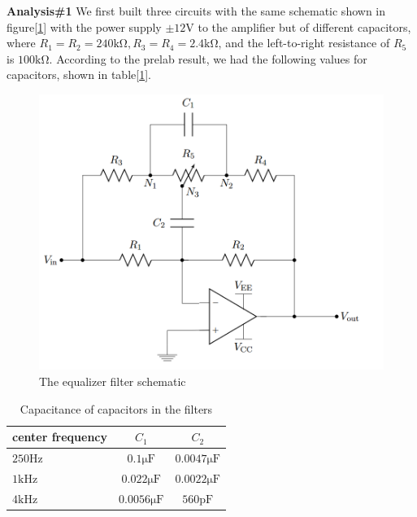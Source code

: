 \hfill \newline
\textbf{Analysis\#1} \newline
\phantom{ } We first built three circuits with the same schematic shown in figure[\ref{fig:circ1}] with the power supply $\pm12\si{\volt}$ to the amplifier but of different capacitors, where $R_1=R_2=240\si{\kilo\ohm},R_3=R_4=2.4\si{\kilo\ohm}$, and the left-to-right resistance of $R_5$ is $100\si{\kilo\ohm}$. According to the prelab result, we had the following values for capacitors, shown in table[\ref{tab:chos}].

\begin{figure}[!htbp]
	\centering
	\begin{framed}
		\includegraphics[width=\linewidth]{images/circ1.png}
		\caption{The equalizer filter schematic}
		\label{fig:circ1}
	\end{framed}
\end{figure}

\begin{table}[!htbp]
	\centering
	\caption{Capacitance of capacitors in the filters}
	\begin{tabular}{lcc}
		\toprule
		center frequency & $C_1$ & $C_2$ \\
		\midrule
		$250\si{\hertz}$ & $0.1\si{\micro\farad}$ & $0.0047\si{\micro\farad}$ \\
		$1\si{\kilo\hertz}$ & $0.022\si{\micro\farad}$ & $0.0022\si{\micro\farad}$ \\
		$4\si{\kilo\hertz}$ & $0.0056\si{\micro\farad}$ & $560\si{\pico\farad}$ \\
		\bottomrule
	\end{tabular}
	\label{tab:chos}
\end{table}

